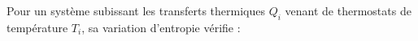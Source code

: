 ﻿\documentclass[a4paper]{article}
\begin{document}
\pagestyle{fancy}
\fancyhf{}
\setlength{\headheight}{15pt}

\begin{center}
	\large{}
\end{center}


Pour un système subissant les transferts thermiques \(Q_i\) venant de thermostats de température \(T_i\), sa variation d'entropie vérifie :\begin{center}
\end{center}
\end{document}
